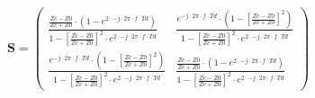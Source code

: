 \[ \mathbf{S} = \left(\begin{array}{cc}  \frac{  \frac{ Zc-Z0 }{ Zc +
Z0 } \cdot \left( 1 - e^{2 \cdot  -j \cdot 2 \pi \cdot f \cdot Td }
\right) }{ 1 - \left[  \frac{ Zc-Z0 }{ Zc + Z0 } \right]^2 \cdot e^{2
\cdot  -j \cdot 2 \pi \cdot f \cdot Td }  } &  \frac{ e^{ -j \cdot 2
\pi \cdot f \cdot Td} \cdot \left( 1 - \left[  \frac{ Zc-Z0 }{ Zc + Z0
} \right] ^2 \right) }{ 1 - \left[  \frac{ Zc-Z0 }{ Zc + Z0 }
\right]^2 \cdot e^{2 \cdot  -j \cdot 2 \pi \cdot f \cdot Td }  }  \\
\frac{ e^{ -j \cdot 2 \pi \cdot f \cdot Td} \cdot \left( 1 - \left[
\frac{ Zc-Z0 }{ Zc + Z0 } \right] ^2 \right) }{ 1 - \left[  \frac{
Zc-Z0 }{ Zc + Z0 } \right]^2 \cdot e^{2 \cdot  -j \cdot 2 \pi \cdot f
\cdot Td }  }  &  \frac{  \frac{ Zc-Z0 }{ Zc + Z0 } \cdot \left( 1 -
e^{2 \cdot  -j \cdot 2 \pi \cdot f \cdot Td }  \right) }{ 1 - \left[
\frac{ Zc-Z0 }{ Zc + Z0 } \right]^2 \cdot e^{2 \cdot  -j \cdot 2 \pi
\cdot f \cdot Td }  } \end{array}\right) \]
